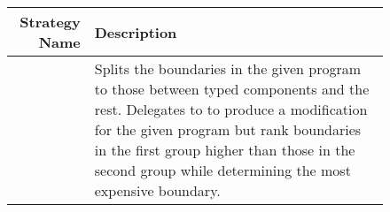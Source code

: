 \begin{figure}[htb]
 
  \newcommand{\desc}[1]{\parbox[t]{21.5em}{#1}}

 
  \def\desca{\desc{Splits the boundaries in the given program to those
  between typed components and the rest.  Delegates to \featopt{} to
  produce a modification for the given program but rank boundaries  
  in the first group higher than those in the second group while
  determining the most expensive boundary.}}

   \def\descb{\desc{Same as \featcostopt{} except that it delegates 
   to \featcon{}.}}

   \def\descc{\desc{Separates the typed components   that have boundaries
   with other typed components from the rest of the components in the
   given program. Delegates to \statselfopt{} to produce a modification
   for the given program  but rank boundaries between components  
  in the first group higher than the rest of the boundaries
  determining the most expensive boundary.}}

   \def\descd{\desc{Same as \statselfcostopt{} except that it delegates 
   to \stattotalopt{}.}}

   \def\desce{\desc{Same as \statselfcostopt{} except that it delegates 
   to \statselfcon{}.}}

   \def\descf{\desc{Same as \statselfcostopt{} except that it delegates 
   to \stattotalcon{}.}}

   \def\descg{\desc{If the number of typed components in the given program 
   is above a threshold $N$, it delegates to \featopt{}. Otherwise, it
   delegates to \featcon{}.}}

    \def\desch{\desc{Same as \featconf{} except that it delegates 
   to \statselfopt{} or \statselfcon{}.}}

    \def\descj{\desc{Same as \featconf{} except that it delegates 
   to \stattotalopt{} or \stattotalcon{}.}}



 \begin{tabular}{r|l}
    {\bf Strategy Name} & {\bf Description} \\\hline
    \featcostopt{}      &   \desca           \\\hline
    \featcostcon{}      &   \descb           \\\hline
  

\end{tabular}
\end{figure}
